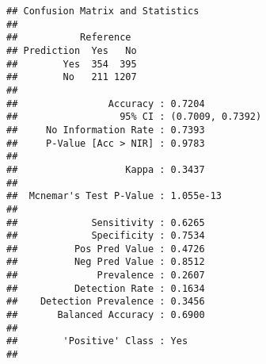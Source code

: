 \documentclass[
]{book}
\begin{document}
\begin{verbatim}
## Confusion Matrix and Statistics
## 
##           Reference
## Prediction  Yes   No
##        Yes  354  395
##        No   211 1207
##                                           
##                Accuracy : 0.7204          
##                  95% CI : (0.7009, 0.7392)
##     No Information Rate : 0.7393          
##     P-Value [Acc > NIR] : 0.9783          
##                                           
##                   Kappa : 0.3437          
##                                           
##  Mcnemar's Test P-Value : 1.055e-13       
##                                           
##             Sensitivity : 0.6265          
##             Specificity : 0.7534          
##          Pos Pred Value : 0.4726          
##          Neg Pred Value : 0.8512          
##              Prevalence : 0.2607          
##          Detection Rate : 0.1634          
##    Detection Prevalence : 0.3456          
##       Balanced Accuracy : 0.6900          
##                                           
##        'Positive' Class : Yes             
## 
\end{verbatim}

  
\end{document}
